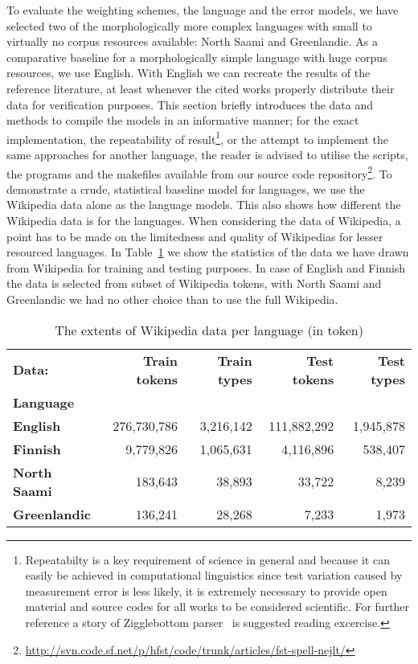 \documentclass[a4paper,12pt]{article}
\begin{document}
To evaluate the weighting schemes, the language and the error models, we have
selected two of the morphologically more complex languages with small to
virtually no corpus resources available: North Saami and Greenlandic.  As a
comparative baseline for a morphologically simple language with huge corpus
resources, we use English.  With English we can recreate the results of the
reference literature, at least whenever the cited works properly distribute
their data for verification purposes. This section briefly introduces the data
and methods to compile the models in an informative manner; for the exact
implementation, the repeatability of result\footnote{Repeatabilty is a key
    requirement of science in general and because it can easily be achieved in
    computational linguistics since test variation caused by measurement error
    is less likely, it is extremely necessary to provide open material and
    source codes for all works to be considered scientific. For further
reference a story of Zigglebottom parser~\cite{pedersen2008empiricism} is
suggested reading excercise.}, or the attempt to implement the same approaches
for another language, the reader is advised to utilise the scripts, the
programs and the makefiles available from our source code
repository\footnote{\url{http://svn.code.sf.net/p/hfst/code/trunk/articles/fst-spell-nejlt/}}.
To demonstrate a crude, statistical baseline model for languages, we use the
Wikipedia data alone as the language models. This also shows how different the
Wikipedia data is for the languages.  When considering the data of Wikipedia, a
point has to be made on the limitedness and quality of Wikipedias for lesser
resourced languages. In Table~\ref{table:wikipedia-data} we show the statistics
of the data we have drawn from Wikipedia for training and testing purposes. In
case of English and Finnish the data is selected from subset of Wikipedia
tokens, with North Saami and Greenlandic we had no other choice than to use the
full Wikipedia.

\begin{table}
    \centering
    \begin{tabular}{|l|r|r|r|r|}
        \hline
        \bf Data:       & \bf Train tokens & \bf Train types & \bf Test tokens & \bf Test types \\
        \bf Language    &             &           &             &  \\
        \hline
        \bf English     & 276,730,786 & 3,216,142 & 111,882,292 & 1,945,878 \\
        \hline
        \bf Finnish     & 9,779,826   & 1,065,631 & 4,116,896   & 538,407 \\
        \hline
        \bf North Saami & 183,643     & 38,893    & 33,722      & 8,239 \\
        \hline
        \bf Greenlandic & 136,241     & 28,268    & 7,233       & 1,973 \\
        \hline
    \end{tabular}
    \caption{The extents of Wikipedia data per language (in token)
    \label{table:wikipedia-data}}
\end{table}
\end{document}
